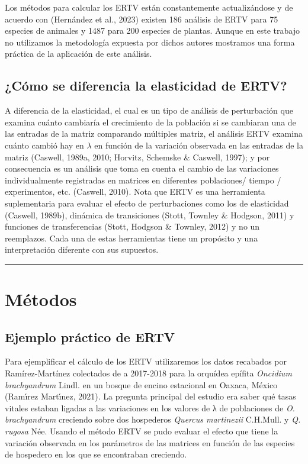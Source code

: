 \documentclass[
  12pt,
  letterpaper,
]{book}
\begin{document}
Los métodos para calcular los ERTV están constantemente actualizándose y
de acuerdo con (Hernández et al., 2023) existen 186 análisis de ERTV
para 75 especies de animales y 1487 para 200 especies de plantas. Aunque
en este trabajo no utilizamos la metodología expuesta por dichos autores
mostramos una forma práctica de la aplicación de este análisis.

\subsection{¿Cómo se diferencia la elasticidad de
ERTV?}\label{cuxf3mo-se-diferencia-la-elasticidad-de-ertv}

A diferencia de la elasticidad, el cual es un tipo de análisis de
perturbación que examina cuánto cambiaría el crecimiento de la población
si se cambiaran una de las entradas de la matriz comparando múltiples
matriz, el análisis ERTV examina cuánto cambió hay en \(\lambda\) en
función de la variación observada en las entradas de la matriz (Caswell,
1989a, 2010; Horvitz, Schemske \& Caswell, 1997); y por consecuencia es
un análisis que toma en cuenta el cambio de las variaciones
individualmente registradas en matrices en diferentes poblaciones/
tiempo / experimentos, etc. (Caswell, 2010). Nota que ERTV es una
herramienta suplementaria para evaluar el efecto de perturbaciones como
los de elasticidad (Caswell, 1989b), dinámica de transiciones (Stott,
Townley \& Hodgson, 2011) y funciones de transferencias (Stott, Hodgson
\& Townley, 2012) y no un reemplazos. Cada una de estas herramientas
tiene un propósito y una interpretación diferente con sus supuestos.

\begin{center}\rule{0.5\linewidth}{0.5pt}\end{center}

\section{Métodos}\label{muxe9todos}

\subsection{Ejemplo práctico de ERTV}\label{ejemplo-pruxe1ctico-de-ertv}

Para ejemplificar el cálculo de los ERTV utilizaremos los datos
recabados por Ramírez-Martínez colectados de a 2017-2018 para la
orquídea epífita \emph{Oncidium brachyandrum} Lindl. en un bosque de
encino estacional en Oaxaca, México (Ramı́rez Martı́nez, 2021). La
pregunta principal del estudio era saber qué tasas vitales estaban
ligadas a las variaciones en los valores de λ de poblaciones de \emph{O.
brachyandrum} creciendo sobre dos hospederos \emph{Quercus martinezii}
C.H.Mull. y \emph{Q. rugosa} Née. Usando el método ERTV se pudo evaluar
el efecto que tiene la variación observada en los parámetros de las
matrices en función de las especies de hospedero en los que se
encontraban creciendo.
\end{document}
